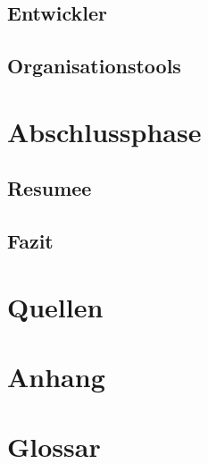 \documentclass[12pt,a4paper]{article}
\begin{document}
\subsection{Entwickler}
\subsection{Organisationstools}
\newpage
\section{Abschlussphase}
\subsection{Resumee}
\subsection{Fazit}
\newpage
\section*{Quellen}
\newpage
\section*{Anhang}
\newpage
\section*{Glossar}
\end{document}
